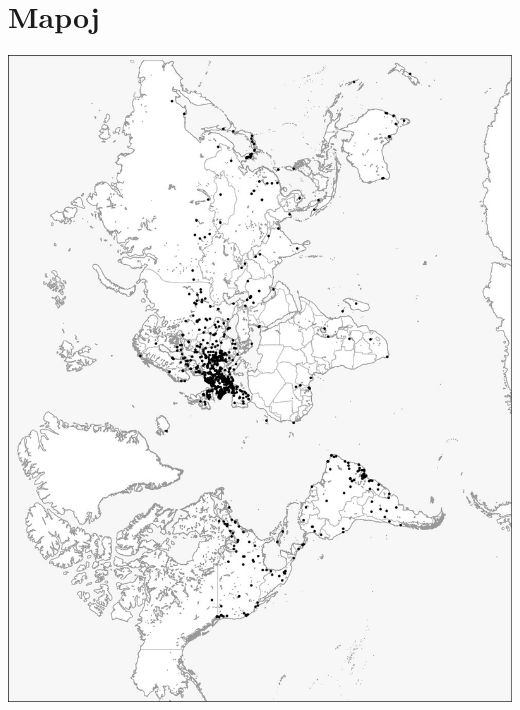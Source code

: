 \thispagestyle{empty}
\part*{Mapoj}

\begin{minipage}{\textwidth} \includegraphics[width=\textwidth]{maps/Mondo.jpg} \end{minipage}

